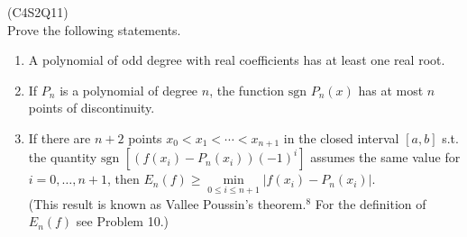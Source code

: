 \begin{prb}
    (C4S2Q11) \\
    Prove the following statements.
    \begin{enumerate}
        \item[a)] A polynomial of odd degree with real coefficients has at least one real root.
        \item[b)] If $P_n$ is a polynomial of degree $n$, the function $\text{sgn } P_n(x)$ has at most $n$ points of discontinuity.
        \item[c)] If there are $n + 2$ points $x_0 < x_1 < \cdots < x_{n+1}$ in the closed interval $[a, b]$ s.t. the quantity
        $\text{sgn } \left[ \left( f(x_i) - P_n(x_i) \right) (-1)^i \right]$ assumes the same value for $i = 0, \ldots, n + 1$, 
        then $E_n(f) \geq \min\limits_{0 \leq i \leq n+1} |f(x_i) - P_n(x_i)|$. \\
        (This result is known as Vallee Poussin's theorem.$^8$ For the definition of $E_n(f)$ see Problem 10.)
    \end{enumerate}
\end{prb}


